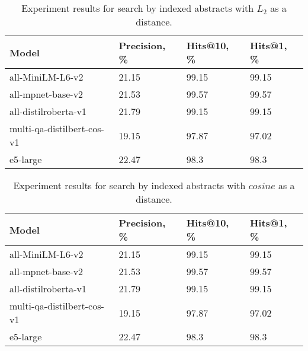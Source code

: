\begin{table*}[!htbp]
    \small
    \centering
    \caption{Experiment results for search by indexed abstracts with \(L_{2}\) as a distance.}

    \begin{tabularx}{0.99\textwidth}{XIII}

        \toprule

        \bfseries Model & \bfseries Precision, \% & \bfseries Hits@10, \% & \bfseries Hits@1, \% \\

        \midrule
        
        all-MiniLM-L6-v2	& 21.15 &	99.15 &	99.15 \\
        all-mpnet-base-v2	& 21.53 &	99.57 &	99.57 \\
        all-distilroberta-v1	& 21.79 &	99.15 &	99.15 \\
        multi-qa-distilbert-cos-v1	& 19.15 &	97.87 &	97.02 \\
        e5-large	& 22.47 &	98.3  &	98.3 \\

        \bottomrule

    \end{tabularx}

    \label{tab:experiments:abs-l2}
\end{table*}

\begin{table*}[!htbp]
    \small
    \centering
    \caption{Experiment results for search by indexed abstracts with \(cosine\) as a distance.}

    \begin{tabularx}{0.99\textwidth}{XIII}

        \toprule

        \bfseries Model & \bfseries Precision, \% & \bfseries Hits@10, \% & \bfseries Hits@1, \% \\

        \midrule
        
        all-MiniLM-L6-v2	& 21.15 &	99.15 &	99.15 \\
        all-mpnet-base-v2	& 21.53 &	99.57 &	99.57 \\
        all-distilroberta-v1	& 21.79 &	99.15 &	99.15 \\
        multi-qa-distilbert-cos-v1	& 19.15 &	97.87 &	97.02 \\
        e5-large	& 22.47 &	98.3  &	98.3 \\

        \bottomrule

    \end{tabularx}

    \label{tab:experiments:abs-cos}
\end{table*}

